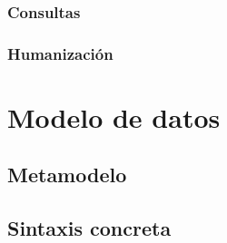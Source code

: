 \subsubsection{Consultas}
\label{sec:Queries}

\subsubsection{Humanización}
\label{sec:Humanization}


\section{Modelo de datos}
\label{sec:DataModel}

\subsection{Metamodelo}
\label{sec:Metamodel}

\subsection{Sintaxis concreta}
\label{sec:ConcreteSyntax}
